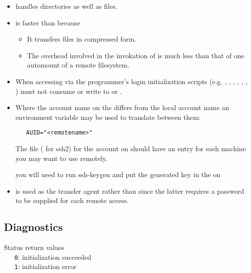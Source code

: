 \begin{itemize}
\item
    handles directories as well as files.
 
\item
    is faster than  because
 
   \begin{itemize}
   \item
      It transfers files in compressed form.
 
   \item
      The overhead involved in the invokation of  is much less
      than that of one automount of a remote filesystem.
   \end{itemize}
 
\item
   When accessing  via  the programmer's
   login initialization scripts (e.g. , ,
   , , , , )
   must not consume  or write to  or .
 
\item
   Where the account name on the  differs from the local
   account name an environment variable may be used to translate between them:
 
\begin{verbatim}
   AUID="<remotename>"
\end{verbatim}
 
   \noindent
   The  file   ( for ssh2)
   for the  account on
    should have an entry for each machine you may want
   to use remotely.

   \noindent
   you will need to run ssh-keygen and put the generated key in the 
    on 
 
\item
    is used as the transfer agent rather than  since
   the latter requires a password to be supplied for each remote access.
\end{itemize}

\subsection*{Diagnostics}
 
Status return values
\\ \verb+   0+:  initialization succeeded
\\ \verb+   1+:  initialization error
 
